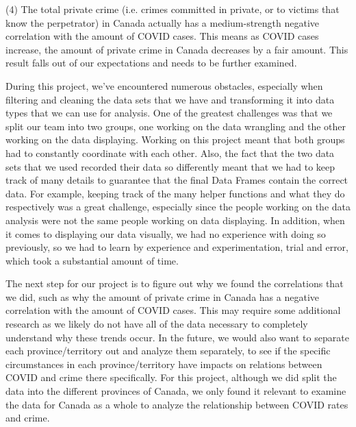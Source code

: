 \documentclass[fontsize=11pt]{article}
\begin{document}
(4) The total private crime (i.e. crimes committed in private, or to victims that know the perpetrator) in Canada actually has a medium-strength negative correlation with the amount of COVID cases. This means as COVID cases increase, the amount of private crime in Canada decreases by a fair amount. This result falls out of our expectations and needs to be further examined.

During this project, we've encountered numerous obstacles, especially when filtering and cleaning the data sets that we have and transforming it into data types that we can use for analysis. One of the greatest challenges was that we split our team into two groups, one working on the data wrangling and the other working on the data displaying. Working on this project meant that both groups had to constantly coordinate with each other. Also, the fact that the two data sets that we used recorded their data so differently meant that we had to keep track of many details to guarantee that the final Data Frames contain the correct data. For example, keeping track of the many helper functions and what they do respectively was a great challenge, especially since the people working on the data analysis were not the same people working on data displaying. In addition, when it comes to displaying our data visually, we had no experience with doing so previously, so we had to learn by experience and experimentation, trial and error, which took a substantial amount of time.

The next step for our project is to figure out why we found the correlations that we did, such as why the amount of private crime in Canada has a negative correlation with the amount of COVID cases. This may require some additional research as we likely do not have all of the data necessary to completely understand why these trends occur. In the future, we would also want to separate each province/territory out and analyze them separately, to see if the specific circumstances in each province/territory have impacts on relations between COVID and crime there specifically. For this project, although we did split the data into the different provinces of Canada, we only found it relevant to examine the data for Canada as a whole to analyze the relationship between COVID rates and crime.
\end{document}
